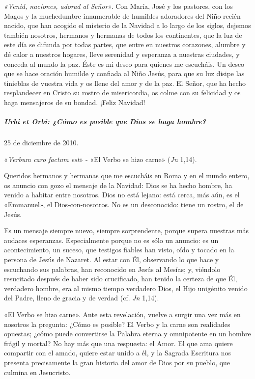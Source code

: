 \documentclass[]{article}
\let\oldsubparagraph\subparagraph
\renewcommand{\subparagraph}[1]{\oldsubparagraph{#1}\mbox{}}
\begin{document}
\emph{«Venid, naciones, adorad al Señor».} Con María, José y los
pastores, con los Magos y la muchedumbre innumerable de humildes
adoradores del Niño recién nacido, que han acogido el misterio de la
Navidad a lo largo de los siglos, dejemos también nosotros, hermanos y
hermanas de todos los continentes, que la luz de este día se difunda por
todas partes, que entre en nuestros corazones, alumbre y dé calor a
nuestros hogares, lleve serenidad y esperanza a nuestras ciudades, y
conceda al mundo la paz. Éste es mi deseo para quienes me escucháis. Un
deseo que se hace oración humilde y confiada al Niño Jesús, para que su
luz disipe las tinieblas de vuestra vida y os llene del amor y de la
paz. El Señor, que ha hecho resplandecer en Cristo su rostro de
misericordia, os colme con su felicidad y os haga mensajeros de su
bondad. ¡Feliz Navidad!

\subparagraph{Urbi et Orbi: ¿Cómo es posible que Dios se haga
hombre?}\label{urbi-et-orbi-cuxf3mo-es-posible-que-dios-se-haga-hombre}

25 de diciembre de 2010.

«\emph{Verbum caro factum est}» - «El Verbo se hizo carne» (\emph{Jn}
1,14).

Queridos hermanos y hermanas que me escucháis en Roma y en el mundo
entero, os anuncio con gozo el mensaje de la Navidad: Dios se ha hecho
hombre, ha venido a habitar entre nosotros. Dios no está lejano: está
cerca, más aún, es el «Emmanuel», el Dios-con-nosotros. No es un
desconocido: tiene un rostro, el de Jesús.

Es un mensaje siempre nuevo, siempre sorprendente, porque supera
nuestras más audaces esperanzas. Especialmente porque no es sólo un
anuncio: es un acontecimiento, un suceso, que testigos fiables han
visto, oído y tocado en la persona de Jesús de Nazaret. Al estar con Él,
observando lo que hace y escuchando sus palabras, han reconocido en
Jesús al Mesías; y, viéndolo resucitado después de haber sido
crucificado, han tenido la certeza de que Él, verdadero hombre, era al
mismo tiempo verdadero Dios, el Hijo unigénito venido del Padre, lleno
de gracia y de verdad (cf. \emph{Jn} 1,14).

«El Verbo se hizo carne». Ante esta revelación, vuelve a surgir una vez
más en nosotros la pregunta: ¿Cómo es posible? El Verbo y la carne son
realidades opuestas; ¿cómo puede convertirse la Palabra eterna y
omnipotente en un hombre frágil y mortal? No hay más que una respuesta:
el Amor. El que ama quiere compartir con el amado, quiere estar unido a
él, y la Sagrada Escritura nos presenta precisamente la gran historia
del amor de Dios por su pueblo, que culmina en Jesucristo.
\end{document}
